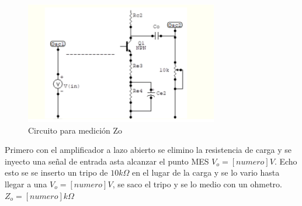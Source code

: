 \documentclass[12pt, letterpaper]{article}
\begin{document}
\singlespacing
\begin{figure}[H]
	\centering
	\includegraphics[width=0.75\textwidth]{Imagenes/zo.png}

	\caption{Circuito para medición Zo}
	\label{fig:med_Zo}
\end{figure}
Primero con el amplificador a lazo abierto se elimino la resistencia de carga y se inyecto una señal de entrada asta alcanzar el punto MES $V_o=[numero]V$. Echo esto se se inserto un tripo de $10k\Omega$ en el lugar de la carga y se lo vario hasta llegar a una $V_o=[numero]V$, se saco el tripo y se lo medio con un ohmetro.
\singlespacing
$Z_o=[numero]k\Omega$
\singlespacing
\end{document}
